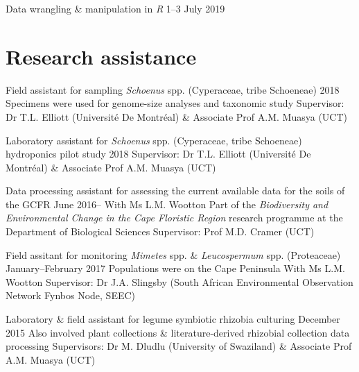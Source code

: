 \documentclass[10pt]{article}
\begin{document}
Data wrangling \& manipulation in \textit{R}      \hfill {\small 1--3 July 2019}

\section*{Research assistance} %

\begin{hangparas}{2em}{1}

Field assistant for sampling \textit{Schoenus} spp. (Cyperaceae, tribe 
Schoeneae)                                           \hfill {\small 2018} \break
Specimens were used for genome-size analyses and taxonomic study \break
Supervisor: Dr T.L. Elliott (Université De Montréal) \& Associate Prof A.M. 
Muasya (UCT)

Laboratory assistant for \textit{Schoenus} spp. (Cyperaceae, tribe Schoeneae) 
hydroponics pilot study                              \hfill {\small 2018} \break
Supervisor: Dr T.L. Elliott (Université De Montréal) \& Associate Prof A.M. 
Muasya (UCT)

Data processing assistant for assessing the current available data for the 
soils of the GCFR                             \hfill {\small June 2016--} \break
With Ms L.M. Wootton \break
Part of the \textit{Biodiversity and Environmental Change in the Cape Floristic 
Region} research programme at the Department of Biological Sciences \break
Supervisor: Prof M.D. Cramer (UCT)

Field assitant for monitoring \textit{Mimetes} spp. \& \textit{Leucospermum} 
spp. (Proteaceae)                  \hfill {\small January--February 2017} \break
Populations were on the Cape Peninsula \break
With Ms L.M. Wootton \break
Supervisor: Dr J.A. Slingsby (South African Environmental Observation Network 
Fynbos Node, SEEC)

Laboratory \& field assistant for legume symbiotic rhizobia culturing
                                            \hfill {\small December 2015} \break
Also involved plant collections \& literature-derived rhizobial collection 
data processing \break
Supervisors: Dr M. Dludlu (University of Swaziland) \& Associate Prof A.M. 
Muasya (UCT)


\hfill

\end{hangparas}
\end{document}
